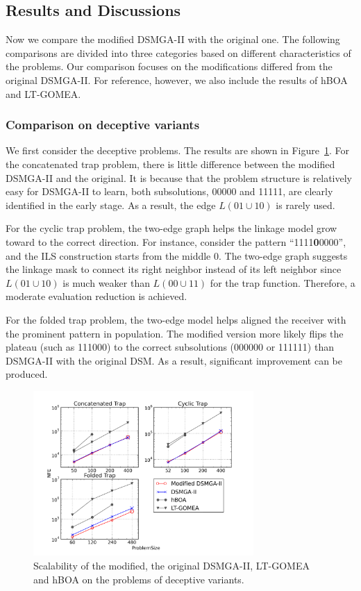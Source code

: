 \subsection{Results and Discussions}

Now we compare the modified DSMGA-II with the original one. The following comparisons are divided into three categories based on different characteristics of the problems. Our comparison focuses on the modifications differed from the original DSMGA-II. For reference, however, we also include the results of hBOA and LT-GOMEA. 

\subsubsection{ Comparison on deceptive variants }


We first consider the deceptive problems. The results are shown in Figure~\ref{fig:trap}.
For the concatenated trap problem, there is little difference between the modified DSMGA-II and the original. It is because that the problem structure is relatively easy for DSMGA-II to learn, both subsolutions, 00000 and 11111, are clearly identified in the early stage. As a result, the edge $L(01\cup10)$ is rarely used. 


For the cyclic trap problem, the two-edge graph helps the linkage model grow toward to the correct direction. For instance, consider the pattern ``1111\textbf{0}0000'', and the ILS construction starts from the middle 0. The two-edge graph suggests the linkage mask to connect its right neighbor instead of its left neighbor since $L(01\cup10)$ is much weaker than $L(00\cup11)$ for the trap function. Therefore, a moderate evaluation reduction is achieved. 

For the folded trap problem, the two-edge model helps aligned the receiver with the prominent pattern in population. The modified version more likely flips the plateau (such as 111000) to the correct subsolutions (000000 or 111111) than DSMGA-II with the original DSM. As a result, significant improvement can be produced. 



\begin{figure}
\centering
\includegraphics[width=3.3in]{trapResults}
\caption{Scalability of the modified, the original DSMGA-II, LT-GOMEA and hBOA on the problems of deceptive variants.}
\label{fig:trap}
\end{figure}


